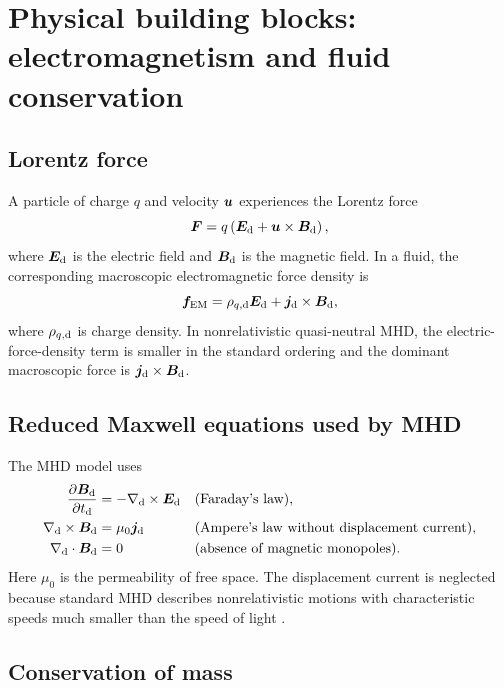 \section{Physical building blocks: electromagnetism and fluid conservation}
\label{sec:buildingblocks}

\subsection{Lorentz force}

A particle of charge $q$ and velocity $\bm{u}$ experiences the Lorentz force
\begin{equation}
\bm{F}=q\left(\bm{E}_{\rm d}+\bm{u}\times\bm{B}_{\rm d}\right),
\end{equation}
where $\bm{E}_{\rm d}$ is the electric field and $\bm{B}_{\rm d}$ is the magnetic field. In a fluid, the corresponding macroscopic electromagnetic force density is
\begin{equation}
\bm{f}_{\rm EM}=\rho_{q,\rm d}\bm{E}_{\rm d}+\bm{j}_{\rm d}\times\bm{B}_{\rm d},
\end{equation}
where $\rho_{q,\rm d}$ is charge density. In nonrelativistic quasi-neutral MHD, the electric-force-density term is smaller in the standard ordering and the dominant macroscopic force is $\bm{j}_{\rm d}\times\bm{B}_{\rm d}$.

\subsection{Reduced Maxwell equations used by MHD}

The MHD model uses
\begin{align}
\frac{\partial\bm{B}_{\rm d}}{\partial t_{\rm d}}
&=-\nabla_{\rm d}\times\bm{E}_{\rm d}
&&\text{(Faraday's law)},\label{eq:faraday}\\
\nabla_{\rm d}\times\bm{B}_{\rm d}
&=\mu_0\bm{j}_{\rm d}
&&\text{(Ampere's law without displacement current)},\label{eq:ampere}\\
\nabla_{\rm d}\cdot\bm{B}_{\rm d}&=0
&&\text{(absence of magnetic monopoles)}.\label{eq:divB}
\end{align}
Here $\mu_0$ is the permeability of free space. The displacement current is neglected because standard MHD describes nonrelativistic motions with characteristic speeds much smaller than the speed of light \cite{Goedbloed2004}.

\subsection{Conservation of mass}

